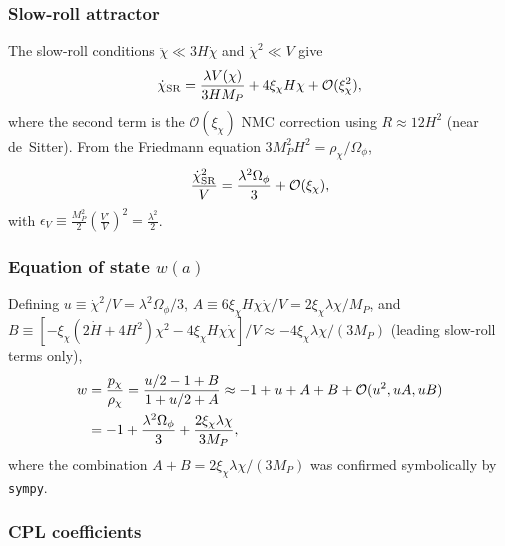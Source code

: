 \subsubsection*{Slow-roll attractor}

The slow-roll conditions $\ddot\chi\ll 3H\dot\chi$ and $\dot\chi^2\ll V$ give
\begin{equation}
    \dot\chi_{\rm SR} = \frac{\lambda V(\chi)}{3HM_P} + 4\xi_\chi H\chi + \mathcal{O}(\xi_\chi^2),
    \label{eq:chidot-SR}
\end{equation}
where the second term is the $\mathcal{O}(\xi_\chi)$ NMC correction using $R\approx 12H^2$
(near de~Sitter).  From the Friedmann equation $3M_P^2 H^2 = \rho_\chi/\Omega_\phi$,
\begin{equation}
    \frac{\dot\chi_{\rm SR}^2}{V} = \frac{\lambda^2\Omega_\phi}{3} + \mathcal{O}(\xi_\chi),
\end{equation}
with $\epsilon_V \equiv \tfrac{M_P^2}{2}\!\left(\tfrac{V'}{V}\right)^{\!2} = \tfrac{\lambda^2}{2}$.

\subsubsection*{Equation of state $w(a)$}

Defining $u\equiv\dot\chi^2/V = \lambda^2\Omega_\phi/3$,
$A\equiv 6\xi_\chi H\chi\dot\chi/V = 2\xi_\chi\lambda\chi/M_P$,
and $B \equiv [-\xi_\chi(2\dot H+4H^2)\chi^2 - 4\xi_\chi H\chi\dot\chi]/V \approx
-4\xi_\chi\lambda\chi/(3M_P)$ (leading slow-roll terms only),
\begin{align}
    w &= \frac{p_\chi}{\rho_\chi}
       = \frac{u/2 - 1 + B}{1 + u/2 + A}
       \approx -1 + u + A + B + \mathcal{O}(u^2, uA, uB) \notag\\
      &= -1 + \frac{\lambda^2\Omega_\phi}{3}
           + \frac{2\xi_\chi\lambda\chi}{3M_P},
    \label{eq:w-NMC}
\end{align}
where the combination $A + B = 2\xi_\chi\lambda\chi/(3M_P)$ was confirmed
symbolically by \texttt{sympy}.

\subsubsection*{CPL coefficients}

